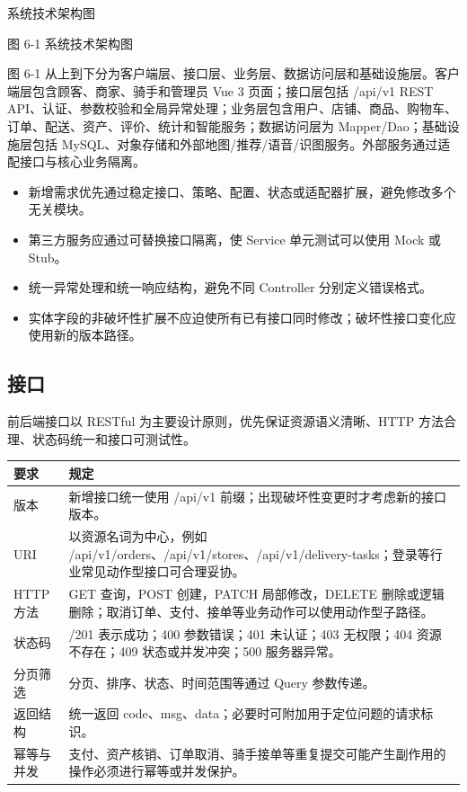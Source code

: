 系统技术架构图

\begin{center}
\end{center}

图 6-1  系统技术架构图

图 6-1 从上到下分为客户端层、接口层、业务层、数据访问层和基础设施层。客户端层包含顾客、商家、骑手和管理员 Vue 3 页面；接口层包括 /api/v1 REST API、认证、参数校验和全局异常处理；业务层包含用户、店铺、商品、购物车、订单、配送、资产、评价、统计和智能服务；数据访问层为 Mapper/Dao；基础设施层包括 MySQL、对象存储和外部地图/推荐/语音/识图服务。外部服务通过适配接口与核心业务隔离。

\begin{itemize}
\item 新增需求优先通过稳定接口、策略、配置、状态或适配器扩展，避免修改多个无关模块。
\item 第三方服务应通过可替换接口隔离，使 Service 单元测试可以使用 Mock 或 Stub。
\item 统一异常处理和统一响应结构，避免不同 Controller 分别定义错误格式。
\item 实体字段的非破坏性扩展不应迫使所有已有接口同时修改；破坏性接口变化应使用新的版本路径。
\end{itemize}

\subsection{接口}

前后端接口以 RESTful 为主要设计原则，优先保证资源语义清晰、HTTP 方法合理、状态码统一和接口可测试性。

\begin{longtable}{|>{\raggedright\arraybackslash}p{}|>{\raggedright\arraybackslash}p{}|}
\hline
\textbf{要求} & \textbf{规定} \\ \hline
版本 & 新增接口统一使用 /api/v1 前缀；出现破坏性变更时才考虑新的接口版本。 \\ \hline
URI & 以资源名词为中心，例如 /api/v1/orders、/api/v1/stores、/api/v1/delivery-tasks；登录等行业常见动作型接口可合理妥协。 \\ \hline
HTTP 方法 & GET 查询，POST 创建，PATCH 局部修改，DELETE 删除或逻辑删除；取消订单、支付、接单等业务动作可以使用动作型子路径。 \\ \hline
状态码 & 200/201 表示成功；400 参数错误；401 未认证；403 无权限；404 资源不存在；409 状态或并发冲突；500 服务器异常。 \\ \hline
分页筛选 & 分页、排序、状态、时间范围等通过 Query 参数传递。 \\ \hline
返回结构 & 统一返回 code、msg、data；必要时可附加用于定位问题的请求标识。 \\ \hline
幂等与并发 & 支付、资产核销、订单取消、骑手接单等重复提交可能产生副作用的操作必须进行幂等或并发保护。 \\ \hline
\end{longtable}

